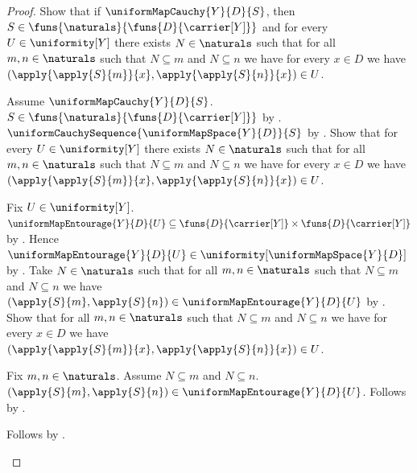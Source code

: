 \begin{proof}
    Show that if $\uniformMapCauchy{Y}{D}{S}$, then
        $S\in\funs{\naturals}{\funs{D}{\carrier[Y]}}$ and for every
        $U\in\uniformity[Y]$ there exists $N\in\naturals$ such that for all
        $m,n\in\naturals$ such that $N\subseteq m$ and $N\subseteq n$ we
        have for every $x\in D$ we have
            $(\apply{\apply{S}{m}}{x},
             \apply{\apply{S}{n}}{x})\in U$.
    \begin{subproof}
        Assume $\uniformMapCauchy{Y}{D}{S}$.
        $S\in\funs{\naturals}{\funs{D}{\carrier[Y]}}$ by
            .
        $\uniformCauchySequence{\uniformMapSpace{Y}{D}}{S}$ by
            .
        Show that for every $U\in\uniformity[Y]$ there exists
            $N\in\naturals$ such that for all $m,n\in\naturals$ such that
            $N\subseteq m$ and $N\subseteq n$ we have for every $x\in D$
            we have $(\apply{\apply{S}{m}}{x},
                \apply{\apply{S}{n}}{x})\in U$.
        \begin{subproof}
            Fix $U\in\uniformity[Y]$.
            $\uniformMapEntourage{Y}{D}{U}\subseteq
                \funs{D}{\carrier[Y]}\times\funs{D}{\carrier[Y]}$ by
                .
            Hence $\uniformMapEntourage{Y}{D}{U}\in
                \uniformity[\uniformMapSpace{Y}{D}]$ by
                .
            Take $N\in\naturals$ such that for all
                $m,n\in\naturals$ such that $N\subseteq m$ and
                $N\subseteq n$ we have $(\apply{S}{m},\apply{S}{n})
                \in\uniformMapEntourage{Y}{D}{U}$ by
                .
            Show that for all $m,n\in\naturals$ such that $N\subseteq m$
                and $N\subseteq n$ we have for every $x\in D$ we have
                $(\apply{\apply{S}{m}}{x},
                 \apply{\apply{S}{n}}{x})\in U$.
            \begin{subproof}
                Fix $m,n\in\naturals$.
                Assume $N\subseteq m$ and $N\subseteq n$.
                $(\apply{S}{m},\apply{S}{n})
                    \in\uniformMapEntourage{Y}{D}{U}$.
                Follows by .
            \end{subproof}
            Follows by \auto.
        \end{subproof}
    \end{subproof}


\end{proof}
